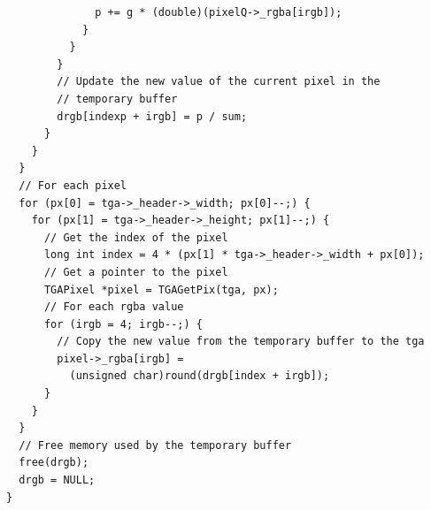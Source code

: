 \documentclass[12pt, a4paper]{article}
\begin{document}
\begin{scriptsize}
\begin{ttfamily}
\begin{lstlisting}
              p += g * (double)(pixelQ->_rgba[irgb]);
            }
          }
        }
        // Update the new value of the current pixel in the 
        // temporary buffer
        drgb[indexp + irgb] = p / sum;
      }
    }
  }
  // For each pixel
  for (px[0] = tga->_header->_width; px[0]--;) {
    for (px[1] = tga->_header->_height; px[1]--;) {
      // Get the index of the pixel
      long int index = 4 * (px[1] * tga->_header->_width + px[0]);
      // Get a pointer to the pixel
      TGAPixel *pixel = TGAGetPix(tga, px);
      // For each rgba value
      for (irgb = 4; irgb--;) {
        // Copy the new value from the temporary buffer to the tga
        pixel->_rgba[irgb] = 
          (unsigned char)round(drgb[index + irgb]);  
      }
    }
  } 
  // Free memory used by the temporary buffer
  free(drgb);
  drgb = NULL;
}


\end{lstlisting}
\end{ttfamily}
\end{scriptsize}
\end{document}
